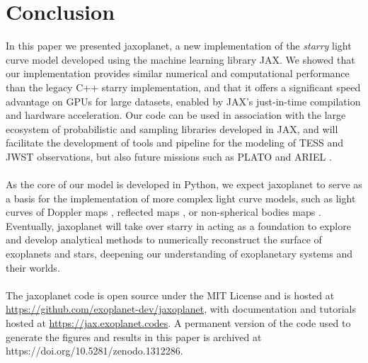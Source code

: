 \documentclass[modern]{aastex631}
\begin{document}
\section{Conclusion}
In this paper we presented \textsf{jaxoplanet}, a new implementation of the \textit{starry} light curve model developed using the machine learning library \textsf{JAX}. We showed that our implementation provides similar numerical and computational performance than the legacy C++ \textsf{starry} implementation, and that it offers a significant speed advantage on GPUs for large datasets, enabled by \textsf{JAX}'s just-in-time compilation and hardware acceleration. Our code can be used in association with the large ecosystem of probabilistic and sampling libraries developed in \textsf{JAX}, and will facilitate the development of tools and pipeline for the modeling of TESS and JWST observations, but also future missions such as PLATO \citep{Rauer2014} and ARIEL \citep{Tinetti2018}.\\\\
As the core of our model is developed in Python, we expect \textsf{jaxoplanet} to serve as a basis for the implementation of more complex light curve models, such as light curves of Doppler maps \citep{Luger2021c}, reflected maps \citep{Luger2022}, or non-spherical bodies maps \citep{Dholakia2024}. Eventually, \textsf{jaxoplanet} will take over \textsf{starry} in acting as a foundation to explore and develop analytical methods to numerically reconstruct the surface of exoplanets and stars, deepening our understanding of exoplanetary systems and their worlds.\\\\
The \textsf{jaxoplanet} code is open source under the MIT License and is hosted at \href{https://github.com/exoplanet-dev/jaxoplanet/}{https://github.com/exoplanet-dev/jaxoplanet}, with documentation and tutorials hosted at \href{https://jax.exoplanet.codes}{https://jax.exoplanet.codes}. A permanent version of the code used to generate the figures and results in this paper is archived at https://doi.org/10.5281/zenodo.1312286.



\appendix
\end{document}
